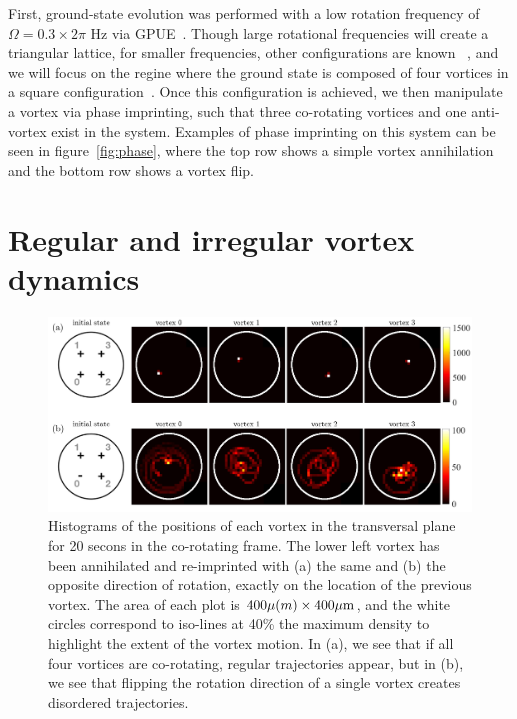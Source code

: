 First, ground-state evolution was performed with a low rotation frequency of $\Omega = 0.3 \times 2\pi$ Hz via GPUE~\cite{schloss2018}.
Though large rotational frequencies will create a triangular lattice, for smaller frequencies, other configurations are known ~\cite{aftalion2001}, and we will focus on the regine where the ground state is composed of four vortices in a square configuration~\cite{zampetaki2013}.
Once this configuration is achieved, we then manipulate a vortex via phase imprinting, such that three co-rotating vortices and one anti-vortex exist in the system.
Examples of phase imprinting on this system can be seen in figure~\ref{fig:phase}, where the top row shows a simple vortex annihilation and the bottom row shows a vortex flip.

\section{Regular and irregular vortex dynamics}

\begin{figure}
\includegraphics[width=\textwidth]{data/2d/histogram/histogram}

\caption{
Histograms of the positions of each vortex in the transversal plane for 20 secons in the co-rotating frame.
The lower left vortex has been annihilated and re-imprinted with (a) the same and (b) the opposite direction of rotation, exactly on the location of the previous vortex.
The area of each plot is $400\mu \text(m) \times 400 \mu \text{m}$, and the white circles correspond to iso-lines at 40\% the maximum density to highlight the extent of the vortex motion.
In (a), we see that if all four vortices are co-rotating, regular trajectories appear, but in (b), we see that flipping the rotation direction of a single vortex creates disordered trajectories.
}
\label{fig:histogram}
\end{figure}

